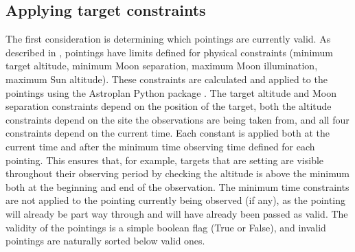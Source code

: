\subsection{Applying target constraints}
\label{sec:constraints}
\begin{colsection}

The first consideration is determining which pointings are currently valid. As described in , pointings have limits defined for physical constraints (minimum target altitude, minimum Moon separation, maximum Moon illumination, maximum Sun altitude). These constraints are calculated and applied to the pointings using the Astroplan Python package \citep[\footnote{\url{https://astroplan.readthedocs.io}},][]{astroplan}. The target altitude and Moon separation constraints depend on the position of the target, both the altitude constraints depend on the site the observations are being taken from, and all four constraints depend on the current time. Each constant is applied both at the current time and after the minimum time observing time defined for each pointing. This ensures that, for example, targets that are setting are visible throughout their observing period by checking the altitude is above the minimum both at the beginning and end of the observation. The minimum time constraints are not applied to the pointing currently being observed (if any), as the pointing will already be part way through and will have already been passed as valid. The validity of the pointings is a simple boolean flag (True or False), and invalid pointings are naturally sorted below valid ones.

\end{colsection}


